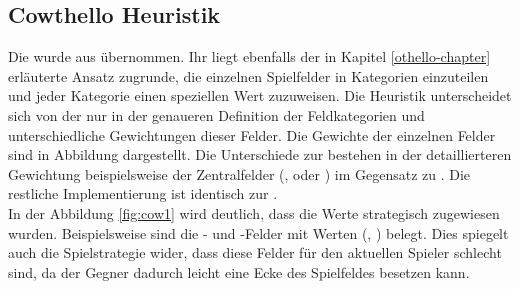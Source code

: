 \subsection{Cowthello Heuristik}
Die  wurde aus \cite{cow1} übernommen. Ihr liegt ebenfalls der in Kapitel \ref{othello-chapter} erläuterte Ansatz zugrunde, die einzelnen Spielfelder in Kategorien einzuteilen und jeder Kategorie einen speziellen Wert zuzuweisen. Die Heuristik unterscheidet sich von der  nur in der genaueren Definition der Feldkategorien und unterschiedliche Gewichtungen dieser Felder.
Die Gewichte der einzelnen Felder sind in Abbildung dargestellt. Die Unterschiede zur  bestehen in der detaillierteren Gewichtung beispielsweise der Zentralfelder (,  oder ) im Gegensatz zu . Die restliche Implementierung ist identisch zur .
\\
In der Abbildung \ref{fig:cow1} wird deutlich, dass die Werte strategisch zugewiesen wurden. Beispielsweise sind die - und -Felder mit  Werten (, ) belegt. Dies spiegelt auch die Spielstrategie wider, dass diese Felder für den aktuellen Spieler schlecht sind, da der Gegner dadurch leicht eine Ecke des Spielfeldes besetzen kann.
